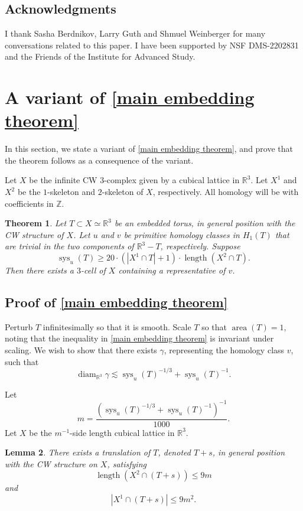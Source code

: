 \documentclass[12pt]{amsart}
\DeclareMathOperator*{\Area}{area}
\DeclareMathOperator*{\diam}{diam}
\DeclareMathOperator*{\length}{length}
\DeclareMathOperator*{\sys}{sys}
\newtheorem{theorem}{Theorem}[section]
\newtheorem{lemma}[theorem]{Lemma}
\theoremstyle{definition}
\begin{document}
\subsection*{Acknowledgments} I thank Sasha Berdnikov, Larry Guth and Shmuel Weinberger for many conversations related to this paper. I have been supported by NSF DMS-2202831 and the Friends of the Institute for Advanced Study.

\section{A variant of \cref{main embedding theorem}}\label{reduction to CW intersection}

In this section, we state a variant of \cref{main embedding theorem}, and prove that the theorem follows as a consequence of the variant. 

Let $X$ be the infinite CW $3$-complex given by a cubical lattice in $\mathbb{R}^3$. Let $X^1$ and $X^2$ be the $1$-skeleton and $2$-skeleton of $X$, respectively. All homology will be with coefficients in $\mathbb{Z}$.

\begin{theorem}\label{main embedding theorem CW version} Let $T\subset X\simeq \mathbb{R}^3$ be an embedded torus, in general position with the CW structure of $X$. Let $u$ and $v$ be primitive homology classes in $H_1(T)$ that are trivial in the two components of $\mathbb{R}^3-T$, respectively. Suppose $$\textstyle\sys_u(T)\geq 20\cdot(|X^1\cap T|+1)\cdot\length(X^2\cap T).$$ Then there exists a $3$-cell of $X$ containing a representative of $v$.
\end{theorem}

\subsection{Proof of \cref{main embedding theorem}}

Perturb $T$ infinitesimally so that it is smooth. Scale $T$ so that $\Area(T)=1$, noting that the inequality in \cref{main embedding theorem} is invariant under scaling. We wish to show that there exists $\gamma$, representing the homology class $v$, such that $$\textstyle\diam_{\mathbb{R}^3}\gamma\lesssim \sys_u(T)^{-1/3}+\sys_u(T)^{-1}.$$

Let $$m=\frac{(\sys_u(T)^{-1/3}+\sys_u(T)^{-1})^{-1}}{1000}.$$ Let $X$ be the $m^{-1}$-side length cubical lattice in $\mathbb{R}^3$. 

\begin{lemma}\label{translation} There exists a translation of $T$, denoted $T+s$, in general position with the CW structure on $X$, satisfying $$\length(X^2\cap (T+s))\leq 9 m$$ and $$|X^1\cap (T+s)|\leq 9 m^2.$$
\end{lemma}
\end{document}

